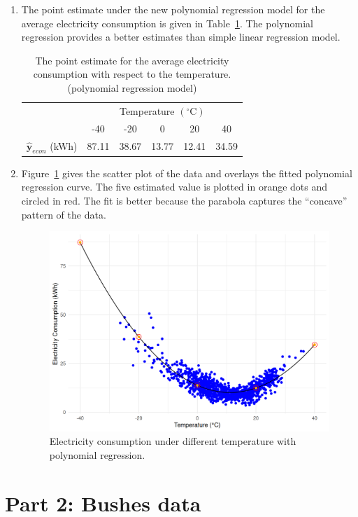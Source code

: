 \documentclass[12pt]{article}
\begin{document}
\begin{enumerate}
\item The point estimate under the new polynomial regression model for the average electricity consumption is given in Table~\ref{Tab:2}.
The polynomial regression provides a better estimates than simple linear regression model.

\begin{table}[htpb]
	\centering
	\begin{tabular}{cccccc}
		\toprule
		\multirow{2}{*}{} &
		\multicolumn{5}{c}{Temperature $(^{\circ}\text{C})$}\\
		 & -40 & -20 & 0 & 20 & 40 \\
		\midrule
		$\hat{\mathbf{y}}_{econ}$ (kWh)&87.11&38.67&13.77&12.41&34.59\\
		\bottomrule
	\end{tabular}
	\caption{The point estimate for the average electricity consumption with respect to the temperature. (polynomial regression model)}
	\label{Tab:2}
\end{table}

\item Figure~\ref{Fig:2} gives the scatter plot of the data and overlays the fitted polynomial regression curve. The five estimated value is plotted in orange dots and circled in red. The fit is better because the parabola captures the ``concave'' pattern of the data.

\begin{figure}[htbp]
\includegraphics[width=.7\textwidth]{2.png}
\centering
\caption{Electricity consumption under different temperature with polynomial regression.}
\label{Fig:2}
\end{figure}
\end{enumerate}


\section{Part 2: Bushes data}
	
\end{document}

